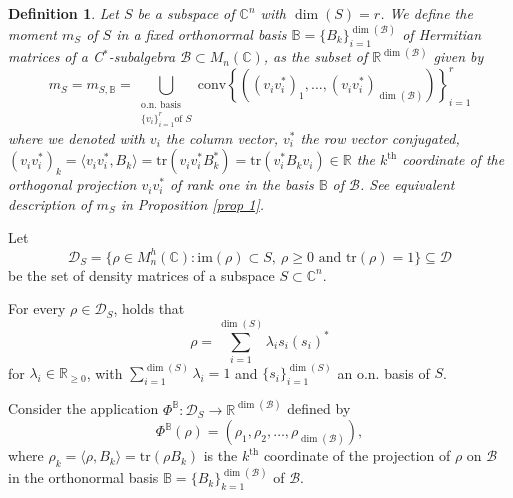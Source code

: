 \documentclass[12pt,a4paper]{article}
\def\calB{\mathcal B}
\def\calD{\mathcal D}
\def\R{\mathbb R}
\def\C{\mathbb C}
\def\tr{\text{tr}}
\def\im{\text{im}}
\newtheorem{definition}{Definition}
\numberwithin{equation}{section}
\begin{document}
\begin{definition}\label{defi mS}
 	Let $S$ be a subspace of $\C^n$ with $\dim(S)=r$. We define the moment $m_S$ of $S$ in a fixed orthonormal basis $\mathbb{B}=\{B_k\}_{i=1}^{\dim(\calB)}$ of Hermitian matrices of a C$^*$-subalgebra $\calB\subset M_n(\C)$, as the subset of $\R^{\dim(\calB)}$ given by
 	\begin{equation}
 		\label{def momento de un Subesp en relacion a B}
 		m_S=m_{S,\mathbb{B}}=\mathop{\bigcup}\limits_{\substack{\text{o.n. basis } \\
 				\{v_i\}_{i=1}^{r} \text{of } S}
 		}  \text{conv}\left\{ \left(\left(v_i v_i^*\right)_1,\dots, \left(v_i v_i^*\right)_{\dim(\calB)} \right)  \right\}_{i=1}^{r}
 	\end{equation}
 	where we denoted with $v_i$ the column vector, $v_i^*$ the row vector conjugated, $\left(v_i v_i^*\right)_k=\langle v_i v_i^*, B_k\rangle=\tr(v_i v_i^* B_k^*)=\tr( v_i^* B_k v_i)\in\R$ the $k^\text{th}$ coordinate of the orthogonal projection  $v_i v_i^*$ of  rank one in the basis $\mathbb{B}$ of $\calB$. See equivalent description of $m_S$ in Proposition \ref{prop 1}. 
 	
  	
\end{definition}

Let 
\begin{equation}
	\label{def matrices de densidad de S}
	\calD_{S}=\{\rho\in M^h_n(\C): \im(\rho)\subset S,\ \rho\geq 0 \text{ and } \tr(\rho)=1\}\subseteq \calD
\end{equation}
be the set of density matrices of a subspace $S\subset \C^n$.

For every $\rho\in\calD_S$, holds that 
\begin{equation}\label{equ densidad escrita usando autovals y autovecs}
\rho=\sum_{i=1}^{\dim(S)} \lambda_i s_i (s_i)^*
\end{equation}
for $\lambda_i\in\R_{\geq 0}$, with $\sum_{i=1}^{\dim(S)} \lambda_i =1$ and $\{s_i\}_{i=1}^{\dim(S)}$ an o.n. basis of $S$. 

Consider the application $\Phi^\mathbb{B}:\calD_{S}\to\R^{\dim(\calB)}$ defined by
\begin{equation}\label{defi phi}
	\Phi^{\mathbb{B}}(\rho)= (\rho_1, \rho_2, \dots, \rho_{\dim(\calB)} ),
\end{equation}
where $\rho_k=\langle \rho,B_k\rangle=\tr(\rho B_k)$ is the $k^{\text{th}}$ coordinate of the projection of $\rho$ on $\calB$ in the orthonormal basis $\mathbb{B}=\{B_k\}_{k=1}^{\dim(\calB)}$ of $\calB$. 
\end{document}
